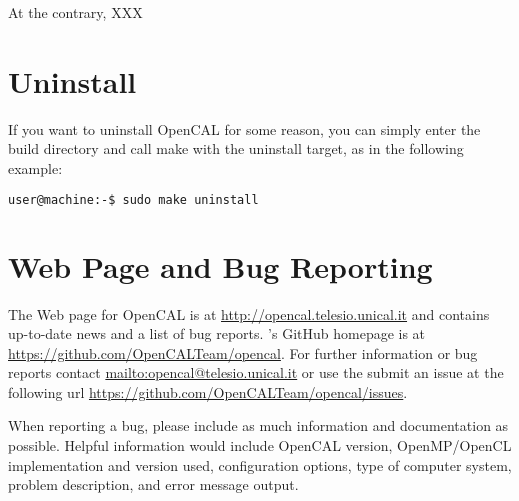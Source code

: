 At the contrary, XXX

\section{Uninstall}

If you want to uninstall OpenCAL for some reason, you can simply enter
the build directory and call make with the uninstall target, as in the
following example:

\begin{lstlisting}[numbers=none,language=bash,label={ch:quickstart:sudouninstall}]
  user@machine:-$ sudo make uninstall
\end{lstlisting}

\section{Web Page and Bug Reporting}

The Web page for OpenCAL is at \url{http://opencal.telesio.unical.it} and
contains up-to-date news and a list of bug reports. \ocal's GitHub
homepage is at \url{https://github.com/OpenCALTeam/opencal}. For
further information or bug reports contact
\url{mailto:opencal@telesio.unical.it} or use the submit an issue at the
following url \url{https://github.com/OpenCALTeam/opencal/issues}.

When reporting a bug, please include as much information and
documentation as possible. Helpful information would include OpenCAL
version, OpenMP/OpenCL implementation and version used,
configuration options, type of computer system, problem description,
and error message output.
